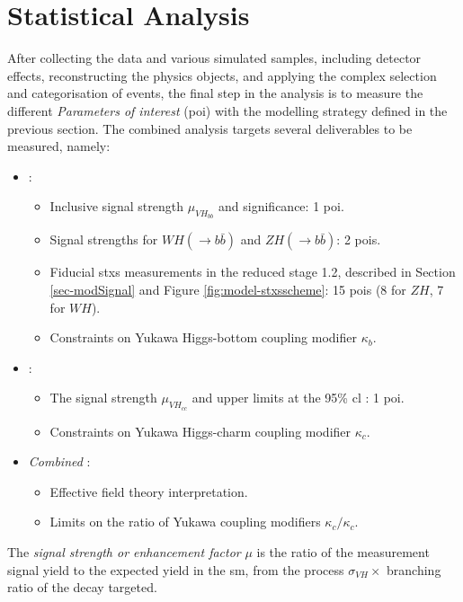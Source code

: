 \section{Statistical Analysis}\label{sec-fitFramework}
After collecting the data and various simulated samples, including detector effects, reconstructing the physics objects, and applying the complex selection and categorisation of events, the final step in the analysis is to measure the different \textit{Parameters of interest} (\gls{poi}) with the modelling strategy defined in the previous section. The combined analysis targets several deliverables to be measured, namely:
\begin{itemize}[leftmargin=*]
\item \textit{\vhb}: 
    \begin{itemize}
        \item Inclusive signal strength $\mu_{VH_{bb}}$ and significance: 1 \gls{poi}.
        \item Signal strengths for $WH(\rightarrow b\bar{b})$ and $ZH(\rightarrow b\bar{b})$: 2 \glspl{poi}.
        \item Fiducial \gls{stxs} measurements in the reduced stage 1.2, described in Section \ref{sec-modSignal} and Figure \ref{fig:model-stxsscheme}: 15 \glspl{poi} (8 for $ZH$, 7 for $WH$).
        \item Constraints on Yukawa Higgs-bottom coupling modifier $\kappa_b$. %
    \end{itemize}
\item \textit{\vhc}:
    \begin{itemize}
        \item The signal strength $\mu_{VH_{cc}}$ and upper limits at the 95\% \gls{cl} : 1 \gls{poi}.
        \item Constraints on Yukawa Higgs-charm coupling modifier $\kappa_c$. %
    \end{itemize}
\item \textit{Combined \vhbc}: 
    \begin{itemize}
        \item Effective field theory interpretation.
        \item Limits on the ratio of Yukawa coupling modifiers $\kappa_c / \kappa_c$. %
    \end{itemize}
\end{itemize}

The \textit{signal strength or enhancement factor} $\mu$ is the ratio of the measurement signal yield to the expected yield in the \gls{sm}, from the process $\sigma_{VH} \times$ branching ratio of the decay targeted.

